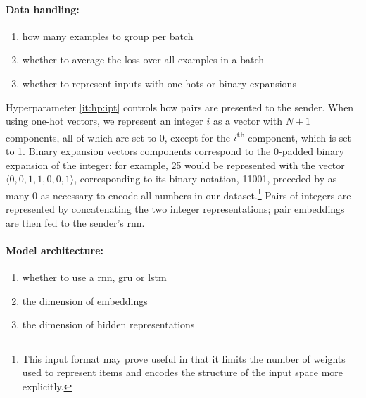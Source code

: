 \documentclass[twocolumn]{article}
\begin{document}
\vspace*{-0.5em}
\paragraph{Data handling:}
\begin{enumerate}[resume*]
    \vspace*{-0.5em}
    \itemsep-0.25em 
    \item \label{it:hp:batch} how many examples to group per batch
    \item \label{it:hp:avg} whether to average the loss over all examples in a batch
    \item \label{it:hp:ipt} whether to represent inputs with one-hots or binary expansions
\end{enumerate}

Hyperparameter \ref{it:hp:ipt} controls how pairs are presented to the sender.
When using one-hot vectors, we represent an integer $i$ as a vector with $N+1$ components, all of which are set to 0, except for the $i$\textsuperscript{th} component, which is set to 1. 
Binary expansion vectors components correspond to the 0-padded binary expansion of the integer: for example, 25 would be represented with the vector $\langle 0, 0, 1, 1, 0, 0, 1\rangle$, corresponding to its binary notation, 11001, preceded by as many 0 as necessary to encode all numbers in our dataset.\footnote{
    This input format may prove useful in that it limits the number of weights used to represent items and encodes the structure of the input space more explicitly.
}
Pairs of integers are represented by concatenating the two integer representations; pair embeddings are then fed to the sender's {\sc rnn}.

\vspace*{-0.5em}
\paragraph{Model architecture:}
\begin{enumerate}[resume*]
    \vspace*{-0.5em}
    \itemsep-0.25em 
    \item whether to use a {\sc rnn}, {\sc gru} or {\sc lstm}
    \item the dimension of embeddings
    \item the dimension of hidden representations
\end{enumerate}

\vspace*{-0.5em}
\end{document}
